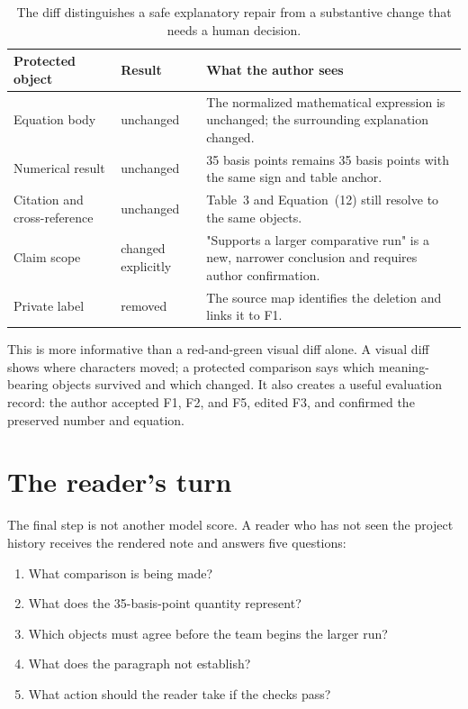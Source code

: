 \hvFigureProtectedDiff

\begin{table}[H]
\centering
\small
\begin{tabular}{@{}p{}p{}p{}@{}}
\toprule
Protected object & Result & What the author sees \\
\midrule
Equation body & unchanged & The normalized mathematical expression is unchanged;
the surrounding explanation changed. \\
Numerical result & unchanged & 35 basis points remains 35 basis points with the
same sign and table anchor. \\
Citation and cross-reference & unchanged & Table~3 and Equation~(12) still
resolve to the same objects. \\
Claim scope & changed explicitly & "Supports a larger comparative run" is a
new, narrower conclusion and requires author confirmation. \\
Private label & removed & The source map identifies the deletion and links it to
F1. \\
\bottomrule
\end{tabular}
\caption{The diff distinguishes a safe explanatory repair from a substantive
change that needs a human decision.}
\label{tab:protected-diff}
\end{table}

This is more informative than a red-and-green visual diff alone. A visual diff
shows where characters moved; a protected comparison says which meaning-bearing
objects survived and which changed. It also creates a useful evaluation record:
the author accepted F1, F2, and F5, edited F3, and confirmed the preserved
number and equation.

\section{The reader's turn}

The final step is not another model score. A reader who has not seen the
project history receives the rendered note and answers five questions:

\begin{enumerate}
\item What comparison is being made?
\item What does the 35-basis-point quantity represent?
\item Which objects must agree before the team begins the larger run?
\item What does the paragraph not establish?
\item What action should the reader take if the checks pass?
\end{enumerate}

